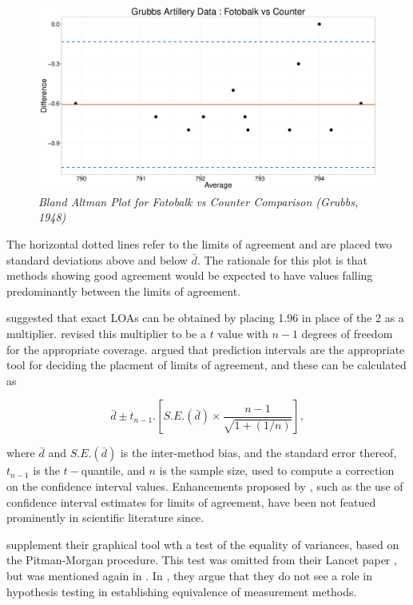 \documentclass[12pt, a4paper]{report}
\theoremstyle{plain}
\theoremstyle{definition}
\theoremstyle{remark}
\begin{document}

\begin{figure}
\centering
\includegraphics[width=0.7\linewidth]{images/FvC}
\caption{\textit{Bland Altman Plot for Fotobalk vs Counter Comparison (Grubbs, 1948)}}
\label{fig:FotobalkVsCounter}
\end{figure}

The horizontal dotted lines refer to the limits of agreement and are placed two standard deviations above and below $\bar{d}$. The rationale for this plot is that methods showing good agreement would be expected to have values falling predominantly between the limits of agreement.


\citet{BA86} suggested that exact LOAs can be obtained by placing 1.96 in place of the 2 as a multiplier. \citet{BA99} revised this multiplier to be a $t$ value with $n-1$ degrees of freedom for the appropriate coverage.
\citet{BXC2008} argued that prediction intervals are the appropriate tool for deciding the placment of limits of agreement, and these can be calculated as

\[ \bar{d} \pm t_{n-1}.\left[ {S.E.(\bar{d})} \times \frac{n-1}{\sqrt{1 + (1/n)}} \right], \]

where $\bar{d}$ and $S.E.(\bar{d})$ is the inter-method bias, and the standard error thereof, $t_{n-1}$ is the $t-$quantile, and $n$ is the sample size, used to compute a correction on the confidence interval values. Enhancements proposed by \citet{BA99}, such as the use of confidence interval estimates for limits of agreement, have been not featued prominently in scientific literature since.


\citet{BA83} supplement their graphical tool wth a test of the equality of variances, based on the Pitman-Morgan procedure. This test was omitted from their Lancet paper \citep{BA86}, but was mentioned again in \citet{BA99}. In \citet{BA99}, they argue that they do not see a role in hypothesis testing in establishing equivalence of measurement methods. 
\end{document}
